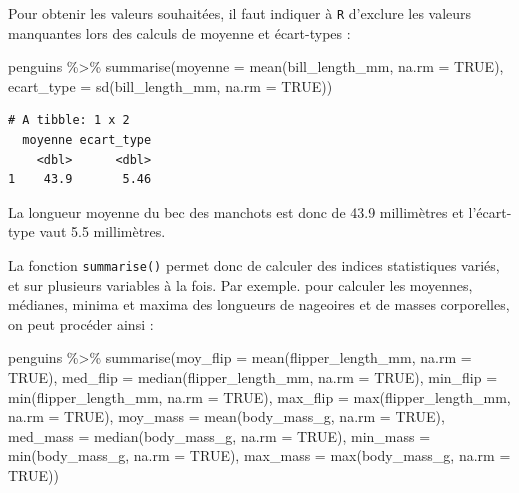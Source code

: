 \documentclass[
  a4paper,
  DIV=11,
  numbers=noendperiod,
  oneside]{scrreprt}
\newenvironment{Shaded}{}{}
\newcommand{\AttributeTok}[1]{\textcolor[rgb]{0.84,0.23,0.29}{#1}}
\newcommand{\ConstantTok}[1]{\textcolor[rgb]{0.00,0.36,0.77}{#1}}
\newcommand{\FunctionTok}[1]{\textcolor[rgb]{0.44,0.26,0.76}{#1}}
\newcommand{\NormalTok}[1]{\textcolor[rgb]{0.14,0.16,0.18}{#1}}
\newcommand{\SpecialCharTok}[1]{\textcolor[rgb]{0.00,0.36,0.77}{#1}}
\begin{document}
Pour obtenir les valeurs souhaitées, il faut indiquer à \texttt{R}
d'exclure les valeurs manquantes lors des calculs de moyenne et
écart-types :

\begin{Shaded}
\begin{Highlighting}[]
\NormalTok{penguins }\SpecialCharTok{\%\textgreater{}\%}
  \FunctionTok{summarise}\NormalTok{(}\AttributeTok{moyenne =} \FunctionTok{mean}\NormalTok{(bill\_length\_mm, }\AttributeTok{na.rm =} \ConstantTok{TRUE}\NormalTok{),}
            \AttributeTok{ecart\_type =} \FunctionTok{sd}\NormalTok{(bill\_length\_mm, }\AttributeTok{na.rm =} \ConstantTok{TRUE}\NormalTok{))}
\end{Highlighting}
\end{Shaded}

\begin{verbatim}
# A tibble: 1 x 2
  moyenne ecart_type
    <dbl>      <dbl>
1    43.9       5.46
\end{verbatim}

La longueur moyenne du bec des manchots est donc de 43.9 millimètres et
l'écart-type vaut 5.5 millimètres.

La fonction \texttt{summarise()} permet donc de calculer des indices
statistiques variés, et sur plusieurs variables à la fois. Par exemple.
pour calculer les moyennes, médianes, minima et maxima des longueurs de
nageoires et de masses corporelles, on peut procéder ainsi :

\begin{Shaded}
\begin{Highlighting}[]
\NormalTok{penguins }\SpecialCharTok{\%\textgreater{}\%} 
  \FunctionTok{summarise}\NormalTok{(}\AttributeTok{moy\_flip =} \FunctionTok{mean}\NormalTok{(flipper\_length\_mm, }\AttributeTok{na.rm =} \ConstantTok{TRUE}\NormalTok{),}
            \AttributeTok{med\_flip =} \FunctionTok{median}\NormalTok{(flipper\_length\_mm, }\AttributeTok{na.rm =} \ConstantTok{TRUE}\NormalTok{),}
            \AttributeTok{min\_flip =} \FunctionTok{min}\NormalTok{(flipper\_length\_mm, }\AttributeTok{na.rm =} \ConstantTok{TRUE}\NormalTok{),}
            \AttributeTok{max\_flip =} \FunctionTok{max}\NormalTok{(flipper\_length\_mm, }\AttributeTok{na.rm =} \ConstantTok{TRUE}\NormalTok{),}
            \AttributeTok{moy\_mass =} \FunctionTok{mean}\NormalTok{(body\_mass\_g, }\AttributeTok{na.rm =} \ConstantTok{TRUE}\NormalTok{),}
            \AttributeTok{med\_mass =} \FunctionTok{median}\NormalTok{(body\_mass\_g, }\AttributeTok{na.rm =} \ConstantTok{TRUE}\NormalTok{),}
            \AttributeTok{min\_mass =} \FunctionTok{min}\NormalTok{(body\_mass\_g, }\AttributeTok{na.rm =} \ConstantTok{TRUE}\NormalTok{),}
            \AttributeTok{max\_mass =} \FunctionTok{max}\NormalTok{(body\_mass\_g, }\AttributeTok{na.rm =} \ConstantTok{TRUE}\NormalTok{))}
\end{Highlighting}
\end{Shaded}
\end{document}
